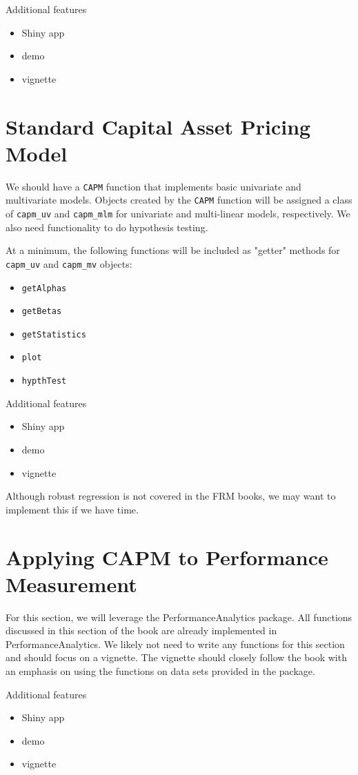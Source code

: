 \documentclass[12pt]{amsart}
\begin{document}
Additional features
\begin{itemize}
\item Shiny app
\item demo
\item vignette
\end{itemize}

\section{Standard Capital Asset Pricing Model}
We should have a \verb"CAPM" function that implements basic univariate and multivariate models. Objects created by the \verb"CAPM" function will be assigned a class of \verb"capm_uv" and \verb"capm_mlm" for univariate and multi-linear models, respectively. We also need functionality to do hypothesis testing.

At a minimum, the following functions will be included as "getter" methods for \verb"capm_uv" and \verb"capm_mv" objects:
\begin{itemize}
\item \verb"getAlphas"
\item \verb"getBetas"
\item \verb"getStatistics"
\item \verb"plot"
\item \verb"hypthTest"
\end{itemize}

Additional features
\begin{itemize}
\item Shiny app
\item demo
\item vignette
\end{itemize}

Although robust regression is not covered in the FRM books, we may want to implement this if we have time.

\section{Applying CAPM to Performance Measurement}
For this section, we will leverage the PerformanceAnalytics package. All functions discussed in this section of the book are already implemented in PerformanceAnalytics. We likely not need to write any functions for this section and should focus on a vignette. The vignette should closely follow the book with an emphasis on using the functions on data sets provided in the package.

Additional features
\begin{itemize}
\item Shiny app
\item demo
\item vignette
\end{itemize}
\end{document}
